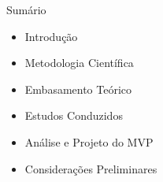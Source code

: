 \begin{frame}{{\sffamily Sumário}}

  \begin{block}{}
    \begin{itemize}
      \item Introdução
      \item Metodologia Científica
      \item Embasamento Teórico
      \item Estudos Conduzidos
      \item Análise e Projeto do MVP
      \item Considerações Preliminares
    \end{itemize}
  \end{block}
\end{frame}
